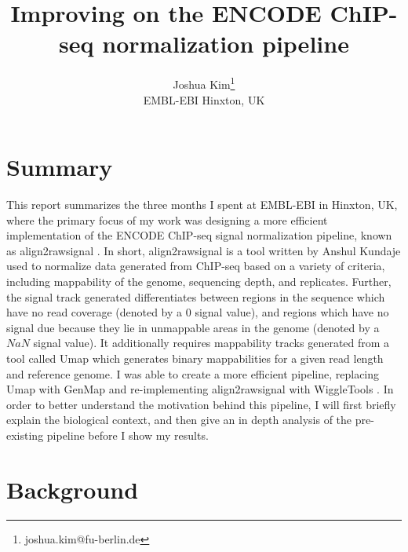 \documentclass[a4paper]{article}
\title{Improving on the ENCODE ChIP-seq normalization pipeline}
\author{Joshua Kim\thanks{joshua.kim@fu-berlin.de}\\EMBL-EBI Hinxton, UK}
\begin{document}
  \maketitle
  \newpage
  \tableofcontents
  \newpage
  \section{Summary}
  This report summarizes the three months I spent at EMBL-EBI in Hinxton, UK, where the primary focus of my work was
  designing a more efficient implementation of the ENCODE ChIP-seq signal normalization pipeline, known as
  align2rawsignal \cite{hoffman_integrative_2013}. In short, align2rawsignal is a tool written by Anshul Kundaje used to
  normalize data generated from ChIP-seq based on a variety of criteria, including mappability of the genome, sequencing depth,
  and replicates. Further, the signal track generated differentiates between regions in the sequence which have no
  read coverage (denoted by a $0$ signal value), and regions which have no signal due because they lie in unmappable areas
  in the genome (denoted by a $NaN$ signal value). It additionally requires mappability tracks generated from a tool
  called Umap \cite{karimzadeh_umap_2018} which generates binary mappabilities for a given read length and reference genome. I was able to
  create a more efficient pipeline, replacing Umap with GenMap \cite{pockrandt_genmap:_2019} and re-implementing align2rawsignal with
  WiggleTools \cite{zerbino_wiggletools:_2014}. In order to better understand the motivation behind this pipeline, I will first briefly explain the
  biological context, and then give an in depth analysis of the pre-existing pipeline before I show my results.

  \section{Background}
\end{document}
